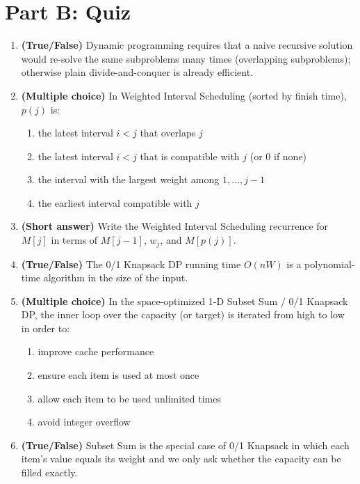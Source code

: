 \documentclass[11pt]{article}
\begin{document}
\newpage
\section*{Part B: Quiz}

\begin{enumerate}[label=\textbf{B\arabic*.}, leftmargin=2.2em]

\item \textbf{(True/False)} Dynamic programming requires that a naive recursive solution
would re-solve the same subproblems many times (overlapping subproblems); otherwise plain
divide-and-conquer is already efficient.

\item \textbf{(Multiple choice)} In Weighted Interval Scheduling (sorted by finish time),
$p(j)$ is:
\begin{enumerate}[label=(\alph*)]
    \item the latest interval $i < j$ that overlaps $j$
    \item the latest interval $i < j$ that is compatible with $j$ (or $0$ if none)
    \item the interval with the largest weight among $1, \ldots, j-1$
    \item the earliest interval compatible with $j$
\end{enumerate}

\item \textbf{(Short answer)} Write the Weighted Interval Scheduling recurrence for $M[j]$
in terms of $M[j-1]$, $w_j$, and $M[p(j)]$.

\item \textbf{(True/False)} The 0/1 Knapsack DP running time $O(nW)$ is a polynomial-time
algorithm in the size of the input.

\item \textbf{(Multiple choice)} In the space-optimized 1-D Subset Sum / 0/1 Knapsack DP,
the inner loop over the capacity (or target) is iterated from high to low in order to:
\begin{enumerate}[label=(\alph*)]
    \item improve cache performance
    \item ensure each item is used at most once
    \item allow each item to be used unlimited times
    \item avoid integer overflow
\end{enumerate}

\item \textbf{(True/False)} Subset Sum is the special case of 0/1 Knapsack in which each
item's value equals its weight and we only ask whether the capacity can be filled exactly.


\end{enumerate}
\end{document}
